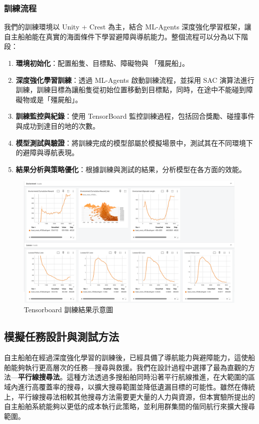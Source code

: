 \documentclass[12pt,a4paper]{article}
\begin{document}
\subsubsection{訓練流程}
我們的訓練環境以 Unity + Crest 為主，結合 ML-Agents 深度強化學習框架，讓自主船舶能在真實的海面條件下學習避障與導航能力。整個流程可以分為以下階段：
\begin{enumerate}
    \item \textbf{環境初始化}：配置船隻、目標點、障礙物與 「殭屍船」。
    \item \textbf{深度強化學習訓練}：透過 ML-Agents 啟動訓練流程，並採用 SAC 演算法進行訓練，訓練目標為讓船隻從初始位置移動到目標點，同時，在途中不能碰到障礙物或是「殭屍船」。
    \item \textbf{訓練監控與紀錄}：使用 TensorBoard 監控訓練過程，包括回合獎勵、碰撞事件與成功到達目的地的次數。
    \item \textbf{模型測試與驗證}：將訓練完成的模型部屬於模擬場景中，測試其在不同環境下的避障與導航表現。
    \item \textbf{結果分析與策略優化}：根據訓練與測試的結果，分析模型在各方面的效能。
\end{enumerate}

\begin{figure}[h]
    \centering
    \includegraphics[scale=0.3]{image/Tensorboard.png}
    \caption{Tensorboard 訓練結果示意圖}
\end{figure}

\subsection{模擬任務設計與測試方法}
自主船舶在經過深度強化學習的訓練後，已經具備了導航能力與避障能力，這使船舶能夠執行更高層次的任務—搜尋與救援。我們在設計過程中選擇了最為直觀的方法—\textbf{平行線搜尋法}\cite{IAMSAR2008}。這種方法透過多搜船舶同時沿著平行航線推進，在大範圍的區域內進行高覆蓋率的搜尋，以擴大搜尋範圍並降低遺漏目標的可能性。雖然在傳統上，平行線搜尋法相較其他搜尋方法需要更大量的人力與資源，但本實驗所提出的自主船舶系統能夠以更低的成本執行此策略，並利用群集間的偕同航行來擴大搜尋範圍。
\end{document}
